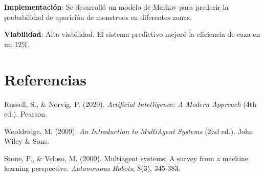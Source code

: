\documentclass[10pt,twocolumn]{article}
\begin{document}
\textbf{Implementación}: Se desarrolló un modelo de Markov para predecir la probabilidad de aparición de monstruos en diferentes zonas.

\textbf{Viabilidad}: Alta viabilidad. El sistema predictivo mejoró la eficiencia de caza en un 12\%.

\section{Referencias}

\begin{thebibliography}{9}

Russell, S., \& Norvig, P. (2020). \textit{Artificial Intelligence: A Modern Approach} (4th ed.). Pearson.

Wooldridge, M. (2009). \textit{An Introduction to MultiAgent Systems} (2nd ed.). John Wiley \& Sons.

Stone, P., \& Veloso, M. (2000). Multiagent systems: A survey from a machine learning perspective. \textit{Autonomous Robots}, 8(3), 345-383.

\end{thebibliography}
\end{document}
